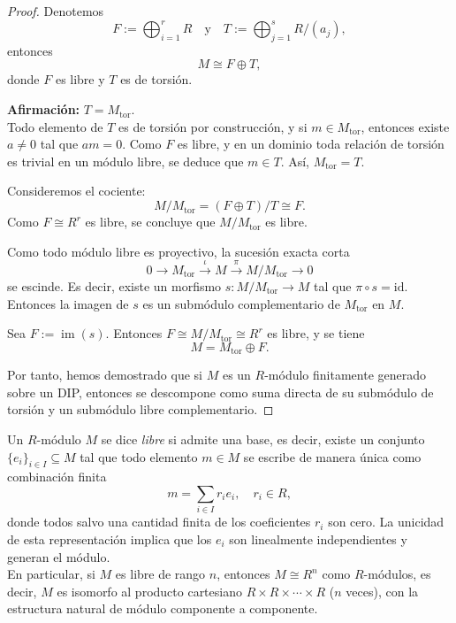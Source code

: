 \begin{enumerate}
\begin{proof}
		Denotemos 
		\[
		F := \bigoplus_{i=1}^r R \quad \text{y} \quad T := \bigoplus_{j=1}^s R/(a_j),
		\]
		entonces 
		\[
		M \cong F \oplus T,
		\]
		donde $F$ es libre y $T$ es de torsión.
		
		\textbf{Afirmación:} $T = M_{\text{tor}}$.\\
		Todo elemento de $T$ es de torsión por construcción, y si $m \in M_{\text{tor}}$, entonces existe $a \neq 0$ tal que $am = 0$. Como $F$ es libre, y en un dominio toda relación de torsión es trivial en un módulo libre, se deduce que $m \in T$. Así, $M_{\text{tor}} = T$.
		
		Consideremos el cociente:
		\[
		M / M_{\text{tor}} = (F \oplus T)/T \cong F.
		\]
		Como $F \cong R^r$ es libre, se concluye que $M / M_{\text{tor}}$ es libre.
		
		Como todo módulo libre es proyectivo, la sucesión exacta corta
		\[
		0 \to M_{\text{tor}} \xrightarrow{\iota} M \xrightarrow{\pi} M/M_{\text{tor}} \to 0
		\]
		se escinde. Es decir, existe un morfismo $s: M/M_{\text{tor}} \to M$ tal que $\pi \circ s = \mathrm{id}$. Entonces la imagen de $s$ es un submódulo complementario de $M_{\text{tor}}$ en $M$.
		
		Sea $F := \operatorname{im}(s)$. Entonces $F \cong M / M_{\text{tor}} \cong R^r$ es libre, y se tiene
		\[
		M = M_{\text{tor}} \oplus F.
		\]
		
		Por tanto, hemos demostrado que si $M$ es un $R$-módulo finitamente generado sobre un DIP, entonces se descompone como suma directa de su submódulo de torsión y un submódulo libre complementario.
	\end{proof}
	\end{enumerate}
	
	\begin{observacion} \upshape
		Un $R$-módulo $M$ se dice \emph{libre} si admite una base, es decir, existe un conjunto $\{e_i\}_{i \in I} \subseteq M$ tal que todo elemento $m \in M$ se escribe de manera única como combinación finita
		\[
		m = \sum_{i \in I} r_i e_i, \quad r_i \in R,
		\]
		donde todos salvo una cantidad finita de los coeficientes $r_i$ son cero. La unicidad de esta representación implica que los $e_i$ son linealmente independientes y generan el módulo.\\
		
	\noindent 	En particular, si $M$ es libre de rango $n$, entonces $M \cong R^n$ como $R$-módulos, es decir, $M$ es isomorfo al producto cartesiano $R \times R \times \cdots \times R$ ($n$ veces), con la estructura natural de módulo componente a componente.
	\end{observacion}
	
